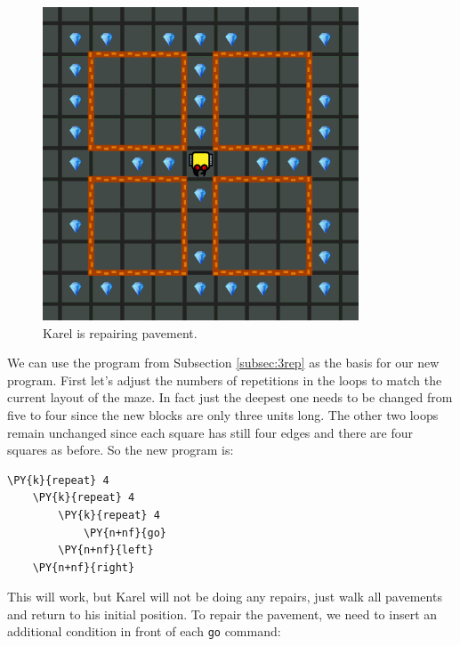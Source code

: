 \begin{figure}[!ht]
\begin{center}
\includegraphics[width=9.4cm]{img/empty-111.png}
\vspace{-0mm}
\caption{Karel is repairing pavement.}
\label{fig:empty-111}
\vspace{-1cm}
\end{center}
\end{figure}
\newpage
\noindent
We can use the program from Subsection \ref{subsec:3rep} as the basis 
for our new program. First let's adjust the numbers of repetitions 
in the loops to match the current layout of the maze. In fact just 
the deepest one needs to be changed from five to four since the new 
blocks are only three units long. The other two loops remain 
unchanged since each square has still four edges and there are
four squares as before. So the new program is:\\

\begin{bbox}
\begin{Verbatim}[commandchars=\\\{\}]
\PY{k}{repeat} 4
    \PY{k}{repeat} 4
        \PY{k}{repeat} 4
            \PY{n+nf}{go}
        \PY{n+nf}{left}
    \PY{n+nf}{right}
\end{Verbatim}
\end{bbox}
\vspace{6mm}

\noindent
This will work, but Karel will not be doing any repairs, just walk
all pavements and return to his initial position.
To repair the pavement, we need to insert an additional condition in front 
of each {\tt go} command:\\

